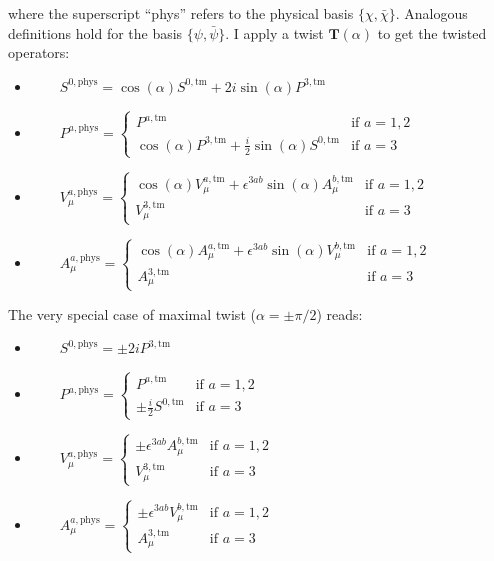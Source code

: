 \documentclass[english, LaM, oneside, noexaminfo]{sapthesis}
\begin{document}
where the superscript ``phys'' refers to the physical basis $\{\chi,\bar\chi\}$.
Analogous definitions hold for the basis $\{\psi,\bar\psi\}$.
I apply a twist $\mathbf{T}(\alpha)$ to get the twisted operators:
\begin{itemize}
    \item [] $ \qquad S^{0,\text{phys}} = \cos (\alpha) S^{0,\text{tm}} + 2i\sin (\alpha) P^{3,\text{tm}}$
    \item [] $ \qquad P^{a,\text{phys}} =
    \begin{cases}
        P^{a,\text{tm}} & \text{if } a = 1,2 \\
        \cos (\alpha) P^{3,\text{tm}} + \frac{i}{2} \sin (\alpha) S^{0,\text{tm}} & \text{if } a = 3
    \end{cases}$
    \item [] $ \qquad V_{\mu}^{a,\text{phys}} = 
    \begin{cases}
        \cos (\alpha) V_\mu^{a,\text{tm}} + \epsilon^{3ab} \sin (\alpha) A_\mu^{b,\text{tm}} & \text{if } a = 1,2 \\
        V_\mu^{3,\text{tm}} & \text{if } a=3
    \end{cases}$
    \item [] $ \qquad A_{\mu}^{a,\text{phys}} = 
    \begin{cases}
        \cos (\alpha) A_\mu^{a,\text{tm}} + \epsilon^{3ab} \sin (\alpha) V_\mu^{b,\text{tm}} & \text{if } a = 1,2 \\
        A_\mu^{3,\text{tm}} & \text{if } a=3
    \end{cases}$
\end{itemize}
The very special case of maximal twist ($\alpha = \pm \pi/2$) reads:
\begin{itemize}
    \item [] $ \qquad S^{0,\text{phys}} = \pm 2i P^{3,\text{tm}}$
    \item [] $ \qquad P^{a,\text{phys}} =
    \begin{cases}
        P^{a,\text{tm}} & \text{if } a = 1,2 \\
        \pm \frac{i}{2} S^{0,\text{tm}} & \text{if } a = 3
    \end{cases}$
    \item [] $ \qquad V_{\mu}^{a,\text{phys}} = 
    \begin{cases}
        \pm \epsilon^{3ab} A_\mu^{b,\text{tm}} & \text{if } a = 1,2 \\
        V_\mu^{3,\text{tm}} & \text{if } a=3
    \end{cases}$
    \item [] $ \qquad A_{\mu}^{a,\text{phys}} = 
    \begin{cases}
        \pm \epsilon^{3ab} V_\mu^{b,\text{tm}} & \text{if } a = 1,2 \\
        A_\mu^{3,\text{tm}} & \text{if } a=3
    \end{cases}$
\end{itemize}
\end{document}
